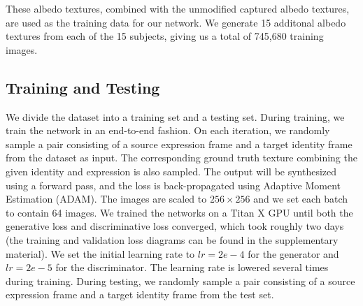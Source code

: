 These albedo textures, combined with the unmodified captured albedo textures, are used as the training data for our network. We generate 15 additonal albedo textures from each of the 15 subjects, giving us a total of 745,680 training images.

\subsection{Training and Testing}

We divide the dataset into a training set and a testing set. During training, we train the network in an end-to-end fashion. On each iteration, we randomly sample a pair consisting of a source expression frame and a target identity frame from the dataset as input. The corresponding ground truth texture combining the given identity and expression is also sampled. The output will be synthesized using a forward pass, and the loss is back-propagated using Adaptive Moment Estimation (ADAM). The images are scaled to $256 \times 256$ and we set each batch to contain 64 images. We trained the networks on a Titan X GPU until both the generative loss and discriminative loss converged, which took roughly two days (the training and validation loss diagrams can be found in the supplementary material). We set the initial learning rate to $lr=2e-4$ for the generator and $lr=2e-5$ for the discriminator. The learning rate is lowered several times during training. During testing, we randomly sample a pair consisting of a source expression frame and a target identity frame from the test set.
